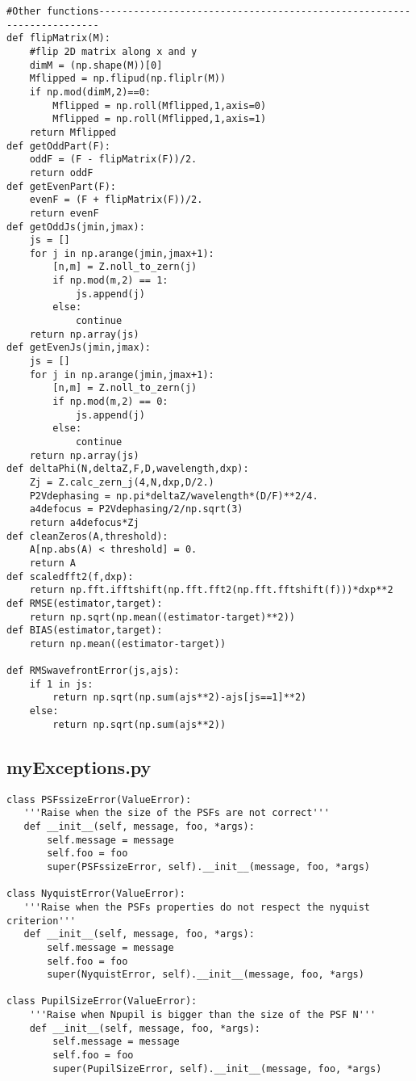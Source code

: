 \begin{lstlisting}
#Other functions----------------------------------------------------------------------
def flipMatrix(M):
    #flip 2D matrix along x and y
    dimM = (np.shape(M))[0]
    Mflipped = np.flipud(np.fliplr(M))
    if np.mod(dimM,2)==0:
        Mflipped = np.roll(Mflipped,1,axis=0)
        Mflipped = np.roll(Mflipped,1,axis=1)
    return Mflipped
def getOddPart(F):
    oddF = (F - flipMatrix(F))/2.
    return oddF
def getEvenPart(F):
    evenF = (F + flipMatrix(F))/2.
    return evenF
def getOddJs(jmin,jmax):
    js = []
    for j in np.arange(jmin,jmax+1):
        [n,m] = Z.noll_to_zern(j)
        if np.mod(m,2) == 1:
            js.append(j)
        else:
            continue
    return np.array(js)
def getEvenJs(jmin,jmax):
    js = []
    for j in np.arange(jmin,jmax+1):
        [n,m] = Z.noll_to_zern(j)
        if np.mod(m,2) == 0:
            js.append(j)
        else:
            continue
    return np.array(js)
def deltaPhi(N,deltaZ,F,D,wavelength,dxp):
    Zj = Z.calc_zern_j(4,N,dxp,D/2.)
    P2Vdephasing = np.pi*deltaZ/wavelength*(D/F)**2/4.
    a4defocus = P2Vdephasing/2/np.sqrt(3)
    return a4defocus*Zj
def cleanZeros(A,threshold):
    A[np.abs(A) < threshold] = 0.
    return A
def scaledfft2(f,dxp):
    return np.fft.ifftshift(np.fft.fft2(np.fft.fftshift(f)))*dxp**2
def RMSE(estimator,target):
    return np.sqrt(np.mean((estimator-target)**2))
def BIAS(estimator,target):
    return np.mean((estimator-target))
    
def RMSwavefrontError(js,ajs):
    if 1 in js:
        return np.sqrt(np.sum(ajs**2)-ajs[js==1]**2)
    else:
        return np.sqrt(np.sum(ajs**2))

\end{lstlisting}

\subsection{myExceptions.py}
\label{subapp:myExceptions}

\begin{lstlisting}
class PSFssizeError(ValueError):
   '''Raise when the size of the PSFs are not correct'''
   def __init__(self, message, foo, *args):
       self.message = message
       self.foo = foo
       super(PSFssizeError, self).__init__(message, foo, *args)

class NyquistError(ValueError):
   '''Raise when the PSFs properties do not respect the nyquist criterion'''
   def __init__(self, message, foo, *args):
       self.message = message
       self.foo = foo
       super(NyquistError, self).__init__(message, foo, *args)

class PupilSizeError(ValueError):
    '''Raise when Npupil is bigger than the size of the PSF N'''
    def __init__(self, message, foo, *args):
        self.message = message
        self.foo = foo
        super(PupilSizeError, self).__init__(message, foo, *args)

\end{lstlisting}


